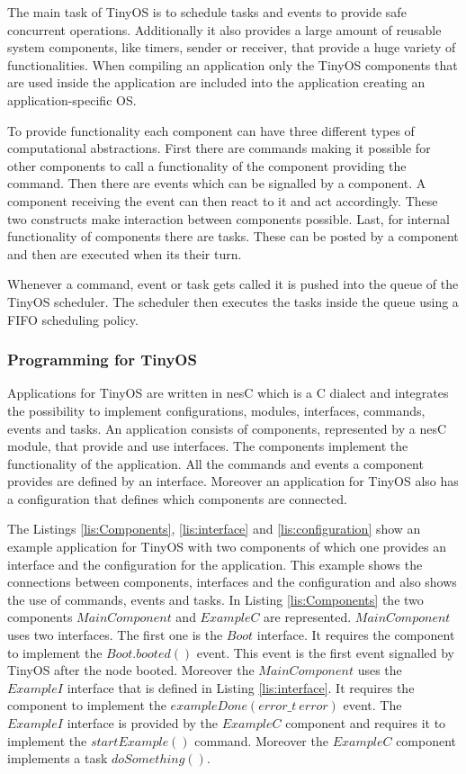 The main task of TinyOS is to schedule tasks and events to provide safe concurrent operations. Additionally it also provides a large amount of reusable system components, like timers, sender or receiver, that provide a huge variety of functionalities. When compiling an application only the TinyOS components that are used inside the application are included into the application creating an application-specific OS.

To provide functionality each component can have three different types of computational abstractions. First there are commands making it possible for other components to call a functionality of the component providing the command. Then there are events which can be signalled by a component. A component receiving the event can then react to it and act accordingly. These two constructs make interaction between components possible. Last, for internal functionality of components there are tasks. These can be posted by a component and then are executed when its their turn. 

Whenever a command, event or task gets called it is pushed into the queue of the TinyOS scheduler. The scheduler then executes the tasks inside the queue using a FIFO scheduling policy. \cite{Tinyos}     

\subsubsection{Programming for TinyOS}
Applications for TinyOS are written in nesC which is a C dialect and integrates the possibility to implement configurations, modules, interfaces, commands, events and tasks. An application consists of components, represented by a nesC module, that provide and use interfaces. The components implement the functionality of the application. All the commands and events a component provides are defined by an interface. Moreover an application for TinyOS also has a configuration that defines which components are connected.   

The Listings \ref{lis:Components}, \ref{lis:interface} and \ref{lis:configuration} show an example application for TinyOS with two components of which one provides an interface and the configuration for the application. This example shows the connections between components, interfaces and the configuration and also shows the use of commands, events and tasks. In Listing \ref{lis:Components} the two components $MainComponent$ and $ExampleC$ are represented. $MainComponent$ uses two interfaces. The first one is the $Boot$ interface. It requires the component to implement the $Boot.booted()$ event. This event is the first event signalled by TinyOS after the node booted. Moreover the $MainComponent$ uses the $ExampleI$ interface that is defined in Listing \ref{lis:interface}. It requires the component to implement the $exampleDone(error\_t\ error)$ event. The $ExampleI$ interface is provided by the $ExampleC$ component and requires it to implement the $startExample()$ command. Moreover the $ExampleC$ component implements a task $doSomething()$.

